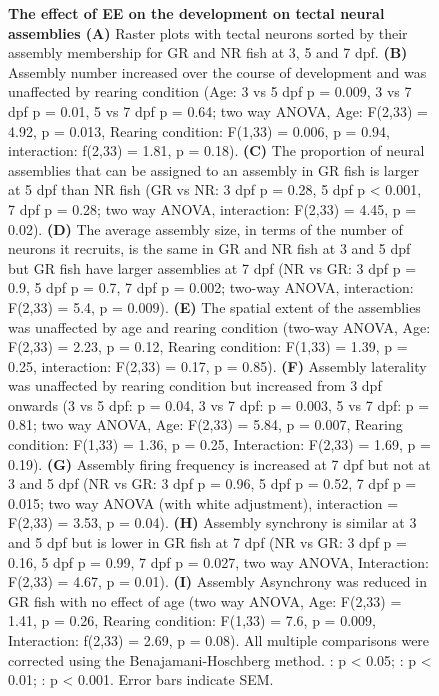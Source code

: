 \begin{figure}[!ht]
            \caption[\label{fig:R2_F4} \textbf{The effect of EE on the development on tectal neural assemblies}]{\label{fig:R2_F4} \textbf{The effect of EE on the development on tectal neural assemblies (A)} Raster plots with tectal neurons sorted by their assembly membership for GR and NR fish at 3, 5 and 7 \gls{dpf}. \textbf{(B)} Assembly number increased over the course of development and was unaffected by rearing condition (Age: 3 vs 5 \gls{dpf} p =  0.009, 3 vs 7 \gls{dpf} p = 0.01, 5 vs 7 \gls{dpf} p =  0.64; two way ANOVA, Age: F(2,33) = 4.92, p = 0.013, Rearing condition: F(1,33) = 0.006, p = 0.94, interaction: f(2,33) = 1.81, p = 0.18). \textbf{(C)} The proportion of neural assemblies that can be assigned to an assembly in GR fish is larger at 5 \gls{dpf} than NR fish (GR vs NR: 3 \gls{dpf}  p = 0.28, 5 \gls{dpf} p < 0.001, 7 \gls{dpf} p = 0.28; two way ANOVA, interaction: F(2,33) = 4.45, p = 0.02). \textbf{(D)} The average assembly size, in terms of the number of neurons it recruits, is the same in GR and NR fish at 3 and 5 \gls{dpf} but GR fish have larger assemblies at 7 \gls{dpf} (NR vs GR: 3 \gls{dpf} p = 0.9, 5 \gls{dpf} p = 0.7, 7 \gls{dpf}  p = 0.002; two-way ANOVA, interaction: F(2,33) = 5.4, p = 0.009).  \textbf{(E)} The spatial extent of the assemblies was unaffected by age and rearing condition (two-way ANOVA, Age: F(2,33) = 2.23, p = 0.12, Rearing condition: F(1,33) = 1.39, p = 0.25, interaction: F(2,33) = 0.17, p = 0.85). \textbf{(F)} Assembly laterality was unaffected by rearing condition but increased from 3 \gls{dpf} onwards (3 vs 5 \gls{dpf}: p = 0.04, 3 vs 7 \gls{dpf}: p = 0.003, 5 vs 7 \gls{dpf}: p = 0.81; two way ANOVA, Age: F(2,33) = 5.84, p = 0.007, Rearing condition: F(1,33) = 1.36, p = 0.25, Interaction: F(2,33) = 1.69, p = 0.19). \textbf{(G)} Assembly firing frequency is increased at 7 \gls{dpf} but not at 3 and 5 \gls{dpf} (NR vs GR: 3 \gls{dpf} p = 0.96, 5 \gls{dpf} p = 0.52, 7 \gls{dpf} p =  0.015; two way ANOVA (with white adjustment), interaction = F(2,33) = 3.53, p = 0.04). \textbf{(H)} Assembly synchrony is similar at 3 and 5 \gls{dpf} but is lower in GR fish at 7 \gls{dpf} (NR vs GR: 3 \gls{dpf} p = 0.16, 5 \gls{dpf} p = 0.99, 7 \gls{dpf} p = 0.027, two way ANOVA, Interaction: F(2,33) = 4.67, p = 0.01). \textbf{(I)} Assembly Asynchrony was reduced in GR fish with no effect of age (two way ANOVA, Age: F(2,33) = 1.41, p = 0.26, Rearing condition: F(1,33) = 7.6, p = 0.009, Interaction: f(2,33) = 2.69, p = 0.08). All multiple comparisons were corrected using the Benajamani-Hoschberg method. \text{*} : p < 0.05; \text{**} : p < 0.01; \text{***}: p < 0.001. Error bars indicate SEM.
            }
      \end{figure}

